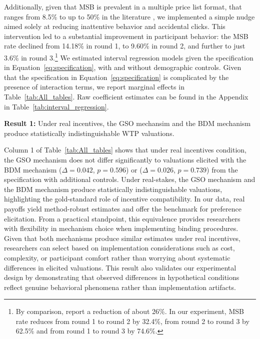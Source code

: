 \documentclass[12pt]{article}
\begin{document}
Additionally, given that MSB is prevalent in a multiple price list format, that ranges from 8.5\%  to up to 50\% in the literature \citep{yu2021multiple, filippin2016reconsideration}, we implemented a simple nudge aimed solely at reducing inattentive behavior and accidental clicks. This intervention led to a substantial improvement in participant behavior: the MSB rate declined from 14.18\% in round 1, to 9.60\% in round 2, and further to just 3.6\% in round 3.\footnote{ By comparison, \citet{yu2021multiple} report a reduction of about 26\%. In our experiment, MSB rate reduces from round 1 to round 2 by 32.4\%, from round 2 to round 3 by 62.5\% and from round 1 to round 3 by 74.6\%.}
We estimated interval regression models given the specification in Equation~\ref{eq:specification}, with and without demographic controls. Given that the specification in Equation~\ref{eq:specification} is complicated by the presence of interaction terms, we report marginal effects in Table~\ref{tab:All_tables}. Raw coefficient estimates can be found in the Appendix in Table~\ref{tab:interval_regression}.


\textbf{Result 1:} Under real incentives, the GSO mechansim and the BDM mechanism produce statistically indistinguishable WTP valuations. 

Column 1 of Table~\ref{tab:All_tables} shows that under real incentives condition, the GSO mechanism does not differ significantly to valuations elicited with the BDM mechanism (\(\Delta = 0.042\), \(p =0.596\)) or (\(\Delta = 0.026\), \(p =0.739\)) from the specification with additional controls. Under real-stakes, the GSO mechanism and the BDM mechanism produce statistically indistinguishable valuations, highlighting the gold-standard role of incentive compatibility. In our data, real payoffs yield method-robust estimates and offer the benchmark for preference elicitation. 
From a practical standpoint, this equivalence provides researchers with flexibility in mechanism choice when implementing binding procedures. Given that both mechanisms produce similar estimates under real incentives, researchers can select based on implementation considerations such as cost, complexity, or participant comfort rather than worrying about systematic differences in elicited valuations.
This result also validates our experimental design by demonstrating that observed differences in hypothetical conditions reflect genuine behavioral phenomena rather than implementation artifacts.
\end{document}
